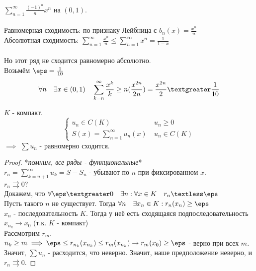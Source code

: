 
\begin{example} \thmslashn

	$\sum^{\infty}_{n = 1} \frac{(-1)^n}{n}x^n$ на $(0, 1)$.\\
	\\
	Равномерная сходимость: по признаку Лейбница с $b_n(x) = \frac{x^n}{n}$\\
	Абсолютная сходимость: $\sum^{\infty}_{n = 1}\frac{x^n}{n} \leq \sum^{\infty}_{n = 1} x^n = \frac{1}{1-x}$\\
	\\
	Но этот ряд не сходится равномерно абсолютно.\\
	Возьмём $\eps = \frac{1}{10}$
	\[ \forall{n} \quad \exists{x \in (0,1)} \quad \sum^{\infty}_{k = n} \frac{x^k}{k} \geq n(\frac{x^{2n}}{2n}) = \frac{x^{2n}}{2} \textgreater \frac{1}{10} \]
\end{example}

\begin{statement} \thmslashn
	
	$K$ - компакт.
	\begin{equation*}
		\begin{cases}
			u_n \in C(K) &\ u_n \geq 0 \\
			S(x) = \sum^{\infty}_{n = 1} u_n(x) &\ u_n \in C(K)
		\end{cases}
	\end{equation*}
	$\implies$ $\sum u_n$ - равномерно сходится.
	\begin{proof} \thmslashn
	
		*\textit{помним, все ряды - функциональные}* \\
		$r_n = \sum^{\infty}_{k = n+1} u_k = S - S_n$ - убывают по $n$ при фиксированном $x$. \\
		$r_n \rightrightarrows 0$? \\
		Докажем, что $\forall{\eps \textgreater 0} \quad \exists n : \forall{x \in K} \quad r_n \textless \eps$ \\
		Пусть такого $n$ не существует. Тогда $\forall{n} \quad \exists{x_n \in K} : r_n(x_n) \geq \eps $ \\
		$x_n$ - последовательность $K$. Тогда у неё есть сходящаяся подпоследовательность $x_{n_k}\to x_0$ (т.к. $K$ - компакт) \\
		Рассмотрим $r_m$. \\
		$n_k \geq m \implies \eps \leq r_{n_k}(x_{n_k}) \leq r_m(x_{n_k}) \to r_m(x_0) \geq \eps $ - верно при всех $m$. \\
		Значит, $\sum u_n$ - расходится, что неверно. Значит, наше предположение неверно, и $r_n \rightrightarrows 0$.
	\end{proof}
\end{statement}
